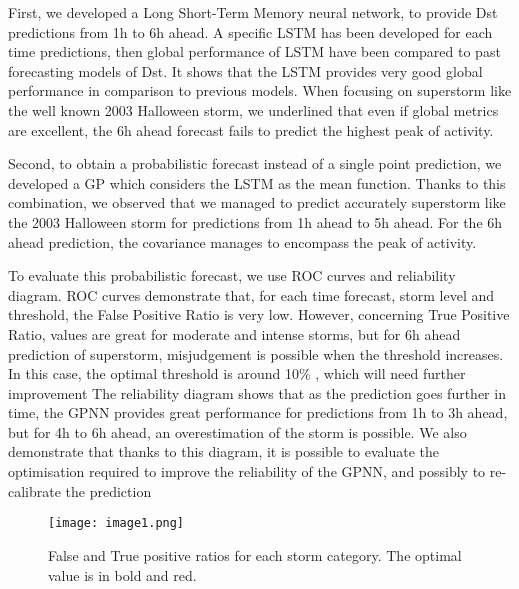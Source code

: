 First, we developed a Long Short-Term Memory neural network, to provide Dst predictions from 1h to 6h ahead. 
A specific LSTM has been developed for each time predictions, then global performance of LSTM have been compared 
to past forecasting models of Dst. It shows that the LSTM provides very good global performance in comparison 
to previous models. When focusing on superstorm like the well known 2003 Halloween storm, we underlined that 
even if global metrics are excellent, the 6h ahead forecast fails to predict the highest peak of activity. 


Second, to obtain a probabilistic forecast instead of a single point prediction, we developed a GP which 
considers the LSTM as the mean function. Thanks to this combination, we observed that we managed to predict 
accurately superstorm like the 2003 Halloween storm for predictions from 1h ahead to 5h ahead. For the 
6h ahead prediction, the covariance manages to encompass the peak of activity. 

To evaluate this probabilistic forecast, we use ROC curves and reliability diagram. ROC curves demonstrate that, 
for each time forecast, storm level and threshold, the False Positive Ratio is very low. However, concerning 
True Positive Ratio, values are great for moderate and intense storms, but for 6h ahead prediction of superstorm, 
misjudgement is possible when the threshold increases. In this case, the optimal threshold is around 10$\%$ , 
which will need further improvement The reliability diagram shows that as the prediction goes further in time, 
the GPNN provides great performance for predictions from 1h to 3h ahead, but for 4h to 6h ahead, 
an overestimation of the storm is possible. We also demonstrate that thanks to this diagram, it is possible to 
evaluate the optimisation required to improve the reliability of the GPNN, and possibly to 
re-calibrate the prediction



\begin{figure}
	\texttt{[image: image1.png]}
	\caption{False and True positive ratios for each storm category. The optimal value is in bold and red.}
	\label{fig:tpfp}
\end{figure}






